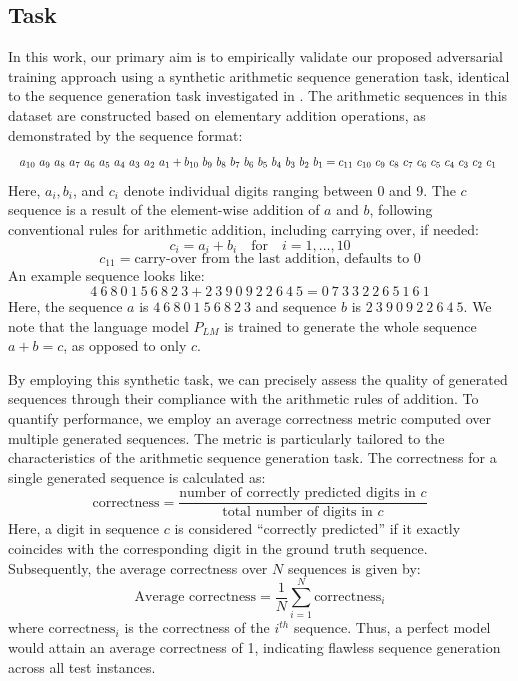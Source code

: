 \documentclass{article}
\begin{document}
\subsection{Task}
\label{sec:task}
In this work, our primary aim is to empirically validate our proposed adversarial training approach using a synthetic arithmetic sequence generation task, identical to the sequence generation task investigated in \cite{ResidualEBM2023}. The arithmetic sequences in this dataset are constructed based on elementary addition operations, as demonstrated by the sequence format:
\[  \resizebox{\linewidth}{!}{%
\(a_{10}\ a_9\ a_8\ a_7\ a_6\ a_5\ a_4\ a_3\ a_2\ a_1 + b_{10}\ b_9\ b_8\ b_7\ b_6\ b_5\ b_4\ b_3\ b_2\ b_1 = c_{11}\ c_{10}\ c_9\ c_8\ c_7\ c_6\ c_5\ c_4\ c_3\ c_2\ c_1\)
}
\]
Here, \(a_i, b_i\), and \(c_i\) denote individual digits ranging between 0 and 9. 
The \(c\) sequence is a result of the element-wise addition of \(a\) and \(b\), following conventional rules for arithmetic addition, including carrying over, if needed:
\[
c_i = a_i + b_i \quad \text{for} \quad i=1,\ldots, 10
\]
\[
c_{11} = \text{carry-over from the last addition, defaults to 0}
\]
An example sequence looks like:
\[
4\ 6\ 8\ 0\ 1\ 5\ 6\ 8\ 2\ 3 + 2\ 3\ 9\ 0\ 9\ 2\ 2\ 6\ 4\ 5 = 0\ 7\ 3\ 3\ 2\ 2\ 6\ 5\ 1\ 6\ 1
\]
Here, the sequence \(a\) is \(4\ 6\ 8\ 0\ 1\ 5\ 6\ 8\ 2\ 3\) and sequence \(b\) is \(2\ 3\ 9\ 0\ 9\ 2\ 2\ 6\ 4\ 5\). We note that the language model \(P_{LM}\) is trained to generate the whole sequence \(a+b=c\), as opposed to only \(c\).

By employing this synthetic task, we can precisely assess the quality of generated sequences through their compliance with the arithmetic rules of addition.
To quantify performance, we employ an average correctness metric computed over multiple generated sequences. The metric is particularly tailored to the characteristics of the arithmetic sequence generation task. The correctness for a single generated sequence is calculated as:
\[
\text{correctness} = \frac{\text{number of correctly predicted digits in } c}{\text{total number of digits in } c}
\]
Here, a digit in sequence \( c \) is considered ``correctly predicted'' if it exactly coincides with the corresponding digit in the ground truth sequence.
Subsequently, the average correctness over \( N \) sequences is given by:
\[
\text{Average correctness} = \frac{1}{N} \sum_{i=1}^{N} \text{correctness}_i
\]
where \( \text{correctness}_i \) is the correctness of the \( i^{th} \) sequence. Thus, a perfect model would attain an average correctness of 1, indicating flawless sequence generation across all test instances.
\end{document}
